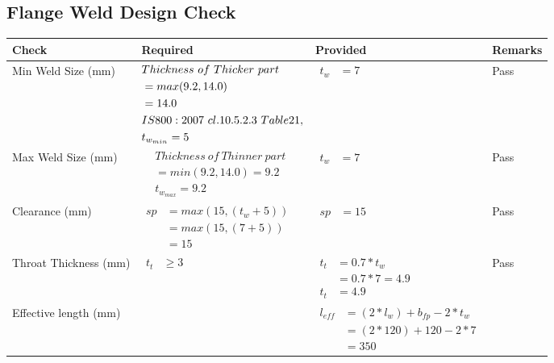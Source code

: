 \documentclass{article}%
\begin{document}
\subsection{Flange Weld Design Check }%
\label{subsec:FlangeWeldDesignCheck}%
\renewcommand{\arraystretch}{1.2}%
\begin{longtable}{|p{4cm}|p{5cm}|p{6.5cm}|p{1.5cm}|}%
\hline%
\rowcolor{OsdagGreen}%
Check&Required&Provided&Remarks\\%
\hline%
\endhead%
\hline%
Min Weld Size (mm)&$\begin{aligned} &Thickness~of~Thicker~part\\ \noindent &=max(9.2,14.0)\\ &=14.0\\ &IS800:2007~cl.10.5.2.3~Table 21,\\  &t_{w_{min}}=5\end{aligned}$&$\begin{aligned} t_w &=7\end{aligned}$&Pass\\%
\hline%
Max Weld Size (mm)&$\begin{aligned} & Thickness~of~Thinner~part\\ &=min(9.2,14.0)=9.2\\ &t_{w_{max}} =9.2\end{aligned}$&$\begin{aligned} t_w &=7\end{aligned}$&Pass\\%
\hline%
Clearance (mm)&$\begin{aligned} sp &= max(15,(t_w+5))\\ &= max(15,(7+5))\\ &=15\end{aligned}$&$\begin{aligned} sp &=15\end{aligned}$&Pass\\%
\hline%
Throat Thickness (mm)&$\begin{aligned} t_t &\geq 3 \end{aligned}$&$\begin{aligned} t_t & = 0.7* t_w \\ & = 0.7*7=4.9\\ t_t & = 4.9\end{aligned}$&Pass\\%
\hline%
Effective length (mm)& &$\begin{aligned} l_{eff} &= (2*l_w) + b_{fp} - 2*t_w\\ &= (2*120) +120 - 2*7\\ & = 350\end{aligned}$&\\%

\end{longtable}
\end{document}
